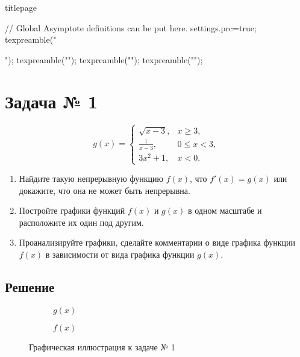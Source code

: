 \documentclass[a4paper,12pt]{article}
\begin{document}
{titlepage}
\clearpage
  \tableofcontents
\clearpage


\begin{asydef}
// Global Asymptote definitions can be put here.
settings.prc=true;
texpreamble("\usepackage{xltxtra,unicode-math}");
texpreamble("\setmainfont{Times New Roman}");
texpreamble("\setsansfont{Arial}\setmonofont{Courier New}");
texpreamble("");
\end{asydef}

\section{Задача № 1}

\[
  g(x) =
  \begin{cases}
    \sqrt{x - 3}, & x \ge 3, \\
    \frac{1}{x - 3}, & 0 \le x < 3, \\
    3 x^2 + 1, & x < 0.
  \end{cases}
\]

\begin{enumerate}
  \item
    Найдите такую непрерывную функцию \(f(x)\),
    что \(f'(x) = g(x)\) или докажите, что она не может быть непрерывна.
  \item
    Постройте графики функций \(f(x)\) и \(g(x)\) в одном масштабе
    и расположите их один под другим.
  \item
    Проанализируйте графики,
    сделайте комментарии о виде графика функции \(f(x)\)
    в зависимости от вида графика функции \(g(x)\).
\end{enumerate}

\subsection{Решение}

\begin{figure}[htbp]
  \centering
  \begin{subfigure}{\textwidth}
    \centering
    \caption{\(g(x)\)}\label{fig:1-g}
  \end{subfigure}
  \begin{subfigure}{\textwidth}
    \centering
    \caption{\(f(x)\)}\label{fig:1-f}
  \end{subfigure}
  \caption{Графическая иллюстрация к задаче № 1} \label{fig:1}
\end{figure}
\end{document}
